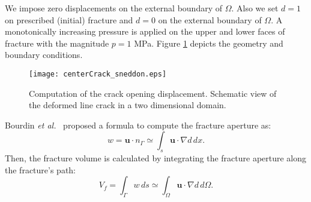 We impose zero displacements on the external boundary of $\Omega$. Also we set $d=1$ on prescribed (initial) fracture and $d=0$ on the external boundary of $\Omega$. A monotonically increasing pressure is applied on the upper and lower faces of fracture with the magnitude $p=1$ MPa. Figure \ref{Fig:Sneddon_geometry} depicts the geometry and boundary conditions.

\begin{figure}
    \centering
    \texttt{[image: centerCrack\_sneddon.eps]}
    \caption{Computation of the crack opening displacement. Schematic view of the deformed line crack in a two dimensional domain.}
    \label{Fig:Sneddon_geometry}
\end{figure}

 

Bourdin \emph{et al.}~\cite{BourdinCFRAC13} proposed a formula to compute the fracture aperture as:
\begin{equation*}
    w=\mathbf{u}\cdot n_{\Gamma} \simeq \int_{s} \mathbf{u} \cdot \nabla d \, dx.
\end{equation*}
Then, the fracture volume is calculated by integrating the fracture aperture along the fracture's path:
\begin{equation*}
    V_f= \int_{\Gamma} w \, ds \simeq \int_{\Omega} \mathbf{u} \cdot \nabla d \, d\Omega.
\end{equation*}

